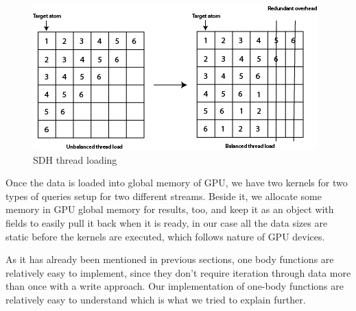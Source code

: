 \documentclass[12pt,letterpaper]{report}
\begin{document}
\begin{figure}
 \centerline{ \includegraphics[width=0.5\columnwidth]{images/threadload} }
 \caption{SDH thread loading}
 \label{fg:threadload}
\end{figure}

\clearpage
\noindent\hspace{3em} Once the data is loaded into global memory of GPU, we have two kernels for two types of queries setup for two different streams. Beside it, we allocate some memory in GPU global memory for results, too, and keep it as an object with fields to easily pull it back when it is ready, in our case all the data sizes are static before the kernels are executed, which follows nature of GPU devices. 

\noindent\hspace{3em} As it has already been mentioned in previous sections, one body functions are relatively easy to implement, since they don't require iteration through data more than once with a write approach. Our implementation of one-body functions are relatively easy to understand which is what we tried to explain further.
\end{document}
